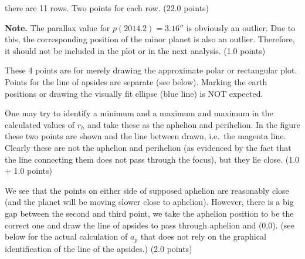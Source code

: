 \begin{description}
  there are 11 rows. Two points for each row. \hfill(22.0 points)

  \textbf{Note.} The parallax value for $p(2014.2) = 3.16''$ is obviously an
  outlier. Due to this, the corresponding position of the minor planet is also
  an outlier. Therefore, it should not be included in the plot or in the next
  analysis. \hfill(1.0 points)


  These 4 points are for merely drawing the approximate polar or rectangular
  plot. Points for the line of apsides are separate (see below). Marking the
  earth positions or drawing the visually fit ellipse (blue line) is NOT
  expected.

  One may try to identify a minimum and a maximum and maximum in the %
  calculated values of $r_h$ and take these as the aphelion and perihelion. In
  the figure these two points are shown and the line between drawn, i.e.\ the
  magenta line. Clearly these are not the aphelion and perihelion (as
  evidenced by the fact that the line connecting them does not pass through
  the focus), but they lie close. \hfill(1.0 + 1.0 points)

  We see that the points on either side of supposed aphelion are reasonably
  close (and the planet will be moving slower close to aphelion). However,
  there is a big gap between the second and third point, we take the aphelion
  position to be the correct one and draw the line of apsides to pass through
  aphelion and (0,0). (see below for the actual calculation of $a_p$ that does
  not rely on the graphical identification of the line of the apsides.)
  \hfill(2.0 points)


\end{description}
